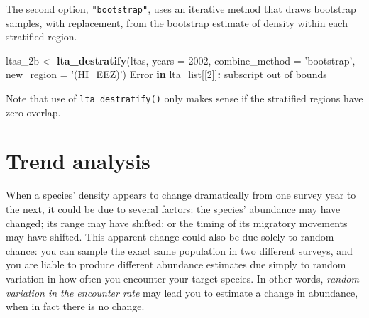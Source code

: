 \documentclass[
]{book}
\newenvironment{Shaded}{\begin{snugshade}}{\end{snugshade}}
\newcommand{\ControlFlowTok}[1]{\textcolor[rgb]{0.13,0.29,0.53}{\textbf{#1}}}
\newcommand{\DataTypeTok}[1]{\textcolor[rgb]{0.13,0.29,0.53}{#1}}
\newcommand{\DecValTok}[1]{\textcolor[rgb]{0.00,0.00,0.81}{#1}}
\newcommand{\KeywordTok}[1]{\textcolor[rgb]{0.13,0.29,0.53}{\textbf{#1}}}
\newcommand{\NormalTok}[1]{#1}
\newcommand{\OperatorTok}[1]{\textcolor[rgb]{0.81,0.36,0.00}{\textbf{#1}}}
\newcommand{\OtherTok}[1]{\textcolor[rgb]{0.56,0.35,0.01}{#1}}
\newcommand{\StringTok}[1]{\textcolor[rgb]{0.31,0.60,0.02}{#1}}
\begin{document}
The second option, \texttt{"bootstrap"}, uses an iterative method that draws bootstrap samples, with replacement, from the bootstrap estimate of density within each stratified region.

\begin{Shaded}
\begin{Highlighting}[]
\NormalTok{ltas_2b <-}
\StringTok{  }\KeywordTok{lta_destratify}\NormalTok{(ltas,}
               \DataTypeTok{years =} \DecValTok{2002}\NormalTok{,}
               \DataTypeTok{combine_method =} \StringTok{'bootstrap'}\NormalTok{,}
               \DataTypeTok{new_region =} \StringTok{'(HI_EEZ)'}\NormalTok{)}
\NormalTok{Error }\ControlFlowTok{in}\NormalTok{ lta_list[[}\DecValTok{2}\NormalTok{]]}\OperatorTok{:}\StringTok{ }\NormalTok{subscript out of bounds}
\end{Highlighting}
\end{Shaded}

\begin{Shaded}
\end{Shaded}

Note that use of \texttt{lta\_destratify()} only makes sense if the stratified regions have zero overlap.

\hypertarget{trend-analysis}{%
\chapter{Trend analysis}\label{trend-analysis}}

When a species' density appears to change dramatically from one survey year to the next, it could be due to several factors: the species' abundance may have changed; its range may have shifted; or the timing of its migratory movements may have shifted. This apparent change could also be due solely to random chance: you can sample the exact same population in two different surveys, and you are liable to produce different abundance estimates due simply to random variation in how often you encounter your target species. In other words, \emph{random variation in the encounter rate} may lead you to estimate a change in abundance, when in fact there is no change.
\end{document}
